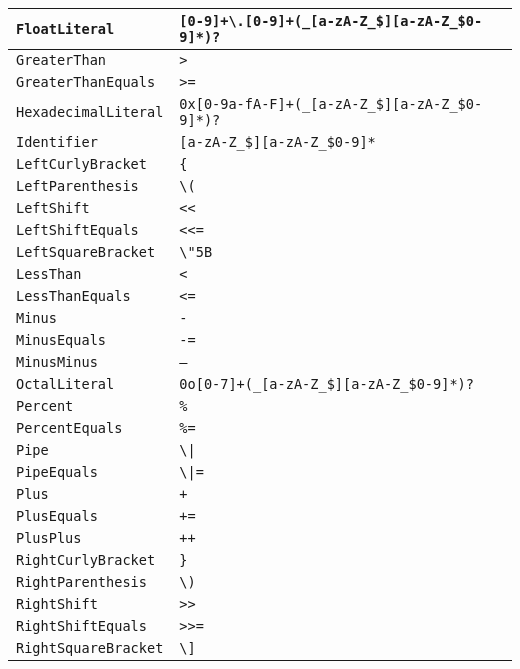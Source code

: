 \begin{xltabular}{\textwidth}{l|X}
	\texttt{FloatLiteral} & \texttt{[0-9]+\textbackslash.[0-9]+(\_[a-zA-Z\_\$][a-zA-Z\_\$0-9]*)?} \\ \hline
	\texttt{GreaterThan} & \texttt{>} \\ \hline
	\texttt{GreaterThanEquals} & \texttt{>=} \\ \hline
	\texttt{HexadecimalLiteral} & \texttt{0x[0-9a-fA-F]+(\_[a-zA-Z\_\$][a-zA-Z\_\$0-9]*)?} \\ \hline
	\texttt{Identifier} & \texttt{[a-zA-Z\_\$][a-zA-Z\_\$0-9]*} \\ \hline
	\texttt{LeftCurlyBracket} & \texttt{\{} \\ \hline
	\texttt{LeftParenthesis} & \texttt{\textbackslash (} \\ \hline
	\texttt{LeftShift} & \texttt{<<} \\ \hline
	\texttt{LeftShiftEquals} & \texttt{<<=} \\ \hline
	\texttt{LeftSquareBracket} & \texttt{\textbackslash \char"5B} \\ \hline
	\texttt{LessThan} & \texttt{<} \\ \hline
	\texttt{LessThanEquals} & \texttt{<=} \\ \hline
	\texttt{Minus} & \texttt{-} \\ \hline
	\texttt{MinusEquals} & \texttt{-=} \\ \hline
	\texttt{MinusMinus} & \texttt{--} \\ \hline
	\texttt{OctalLiteral} & \texttt{0o[0-7]+(\_[a-zA-Z\_\$][a-zA-Z\_\$0-9]*)?} \\ \hline
	\texttt{Percent} & \texttt{\%} \\ \hline
	\texttt{PercentEquals} & \texttt{\%=} \\ \hline
	\texttt{Pipe} & \texttt{\textbackslash |} \\ \hline
	\texttt{PipeEquals} & \texttt{\textbackslash |=} \\ \hline
	\texttt{Plus} & \texttt{+} \\ \hline
	\texttt{PlusEquals} & \texttt{+=} \\ \hline
	\texttt{PlusPlus} & \texttt{++} \\ \hline
	\texttt{RightCurlyBracket} & \texttt{\}} \\ \hline
	\texttt{RightParenthesis} & \texttt{\textbackslash )} \\ \hline
	\texttt{RightShift} & \texttt{>>} \\ \hline
	\texttt{RightShiftEquals} & \texttt{>>=} \\ \hline
	\texttt{RightSquareBracket} & \texttt{\textbackslash ]} \\ \hline

\end{xltabular}
